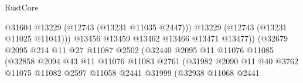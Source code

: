 \begin{lexlean}{RustCore}
\begin{coremodule}
                                                      @31604
                                                      @13229
                                                      (@12743 (@13231 @11035 @2447)))
                                                    @13229
                                                    (@12743 (@13231 @11025 @11041)))
                                                  @13456
                                                  @13459
                                                  @13462
                                                  @13466
                                                  @13471
                                                  @13477))
                                              (@32679
                                                @2095
                                                @214
                                                @11
                                                @27
                                                @11087
                                                @2502
                                                (@32440
                                                  @2095
                                                  @11
                                                  @11076
                                                  @11085
                                                  (@32858
                                                    @2094
                                                    @43
                                                    @11
                                                    @11076
                                                    @11083
                                                    @2761
                                                    (@31982
                                                      @2090
                                                      @11
                                                      @40
                                                      @3762
                                                      @11075
                                                      @11082
                                                      @2597
                                                      @11058
                                                      @2441
                                                      @31999
                                                      (@32938
                                                        @11068
                                                        @2441

\end{coremodule}
\end{lexlean}
